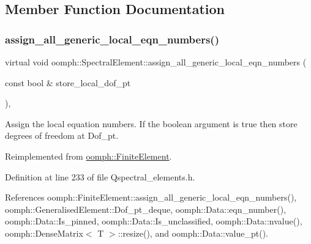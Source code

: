 \subsection{Member Function Documentation}
\mbox{\label{classoomph_1_1SpectralElement_a36eeaa010b3a66ac9ee1556ee7dcc23d}} 
\subsubsection{\texorpdfstring{assign\+\_\+all\+\_\+generic\+\_\+local\+\_\+eqn\+\_\+numbers()}{assign\_all\_generic\_local\_eqn\_numbers()}}
{\footnotesize\ttfamily virtual void oomph\+::\+Spectral\+Element\+::assign\+\_\+all\+\_\+generic\+\_\+local\+\_\+eqn\+\_\+numbers (\begin{DoxyParamCaption}\item[{const bool \&}]{store\+\_\+local\+\_\+dof\+\_\+pt }\end{DoxyParamCaption})\hspace{0.3cm}{\ttfamily [inline]}, {\ttfamily [virtual]}}



Assign the local equation numbers. If the boolean argument is true then store degrees of freedom at Dof\+\_\+pt. 



Reimplemented from \hyperlink{classoomph_1_1FiniteElement_a564ba080f68132762510b1ec9465b05d}{oomph\+::\+Finite\+Element}.



Definition at line 233 of file Qspectral\+\_\+elements.\+h.



References oomph\+::\+Finite\+Element\+::assign\+\_\+all\+\_\+generic\+\_\+local\+\_\+eqn\+\_\+numbers(), oomph\+::\+Generalised\+Element\+::\+Dof\+\_\+pt\+\_\+deque, oomph\+::\+Data\+::eqn\+\_\+number(), oomph\+::\+Data\+::\+Is\+\_\+pinned, oomph\+::\+Data\+::\+Is\+\_\+unclassified, oomph\+::\+Data\+::nvalue(), oomph\+::\+Dense\+Matrix$<$ T $>$\+::resize(), and oomph\+::\+Data\+::value\+\_\+pt().

\mbox{\label{classoomph_1_1SpectralElement_a8482a26d6c6b1e278a5b98cdbb705d67}} 
